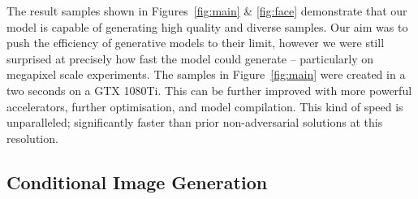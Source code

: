 The result samples shown in Figures~\ref{fig:main} \& \ref{fig:face} demonstrate
that our model is capable of generating high quality and diverse samples. Our
aim was to push the efficiency of generative models to their limit, however we
were still surprised at precisely how fast the model could generate --
particularly on megapixel scale experiments. The samples in
Figure~\ref{fig:main} were created in a two seconds on a GTX 1080Ti. This can be
further improved with more powerful accelerators, further optimisation, and
model compilation. This kind of speed is unparalleled; significantly faster than
prior non-adversarial solutions at this resolution.

\subsection{Conditional Image Generation}
\label{subsec:evaluationConditional}

